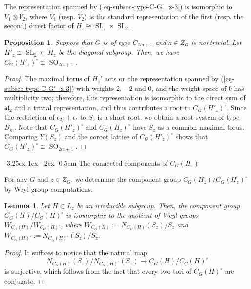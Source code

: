 \documentclass[11pt,oneside,dvipsnames]{amsart}
\makeatletter
\renewcommand\subsection{\@startsection{subsection}{3}{\z@}%
                                     {-3.25ex\@plus -1ex \@minus -.2ex}%
                                     {-0.5em}%
                                     {\normalfont\normalsize\bfseries}}
\theoremstyle{plain}
\newtheorem{Prop}[Thm]{Proposition}
\newtheorem{Lem}[Thm]{Lemma}
\theoremstyle{definition}
\theoremstyle{named}
\DeclareMathOperator{\SL}{SL}
\DeclareMathOperator{\SO}{SO}
\makeatother
\begin{document}
The representation spanned by (\ref{eq-subsec-type-C-G'_z-3}) is isomorphic to $V_1\otimes V_2$, where $V_1$ (resp. $V_2$) is the standard representation of the first (resp. the second) direct factor of $H_z\cong\SL_2\times\SL_2$. 
\begin{Prop}\label{Prop-C2m+1-Stab-circ}
Suppose that $G$ is of type $C_{2m+1}$ and $z\in Z_G$ is nontrivial. Let $H'_z\cong\SL_2\subset H_z$ be the diagonal subgroup. Then, we have $C_G(H'_z)^{\circ}\cong \SO_{2m+1}$.
\end{Prop}
\begin{proof}
The maximal torus of $H_z'$ acts on the representation spanned by (\ref{eq-subsec-type-C-G'_z-3}) with weights $2$, $-2$ and $0$, and the weight space of $0$ has multiplicity two; therefore, this representation is isomorphic to the direct sum of $\mathfrak{sl}_2$ and a trivial representation, and thus contributes a root to $C_G(H'_z)^{\circ}$. Since the restriction of $\epsilon_{2j}+\epsilon_{\ell}$ to $S_z$ is a short root, we obtain a root system of type $B_m$. Note that $C_G(H'_z)^{\circ}$ and $C_G(H_z)^{\circ}$ have $S_z$ as a common maximal torus. Comparing $Y(S_z)$ and the coroot lattice of $C_G(H'_z)^{\circ}$ shows that $C_G(H'_z)^{\circ}\cong\SO_{2m+1}$. 
\end{proof}

\subsection{The connected components of $C_G(H_z)$}\label{subsec-Gamma-G_z}\hfill

For any $G$ and $z\in Z_G$, we determine the component group $C_G(H_z)/C_G(H_z)^{\circ}$ by Weyl group computations.

\begin{Lem}\label{Lem-Gamma=W/W}
Let $H\subset L_z$ be an irreducible subgroup. Then, the component group $C_G(H)/C_G(H)^{\circ}$ is isomorphic to the quotient of Weyl groups $W_{C_G(H)}/W_{C_G(H)^{\circ}}$, where $W_{C_G(H)}:=N_{C_G(H)}(S_z)/S_z$ and $W_{C_G(H)^{\circ}}:=N_{C_G(H)^{\circ}}(S_z)/S_z$.
\end{Lem}
\begin{proof}
It suffices to notice that the natural map 
$$
N_{C_G(H)}(S_z)/N_{C_G(H)^{\circ}}(S_z)\rightarrow C_G(H)/C_G(H)^{\circ}
$$ 
is surjective, which follows from the fact that every two tori of $C_G(H)^{\circ}$ are conjugate.
\end{proof}
\end{document}

